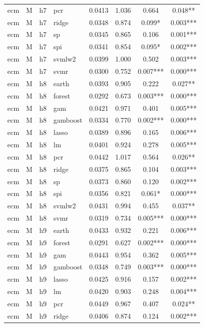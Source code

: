 \begin{ThreePartTable}
\begin{longtable}[t]{llclcccc}
ecm & M & h7 & pcr & 0.0413 & 1.036 & 0.664 & 0.048**\\
ecm & M & h7 & ridge & 0.0348 & 0.874 & 0.099* & 0.003***\\
ecm & M & h7 & sp & 0.0345 & 0.865 & 0.106 & 0.001***\\
ecm & M & h7 & spi & 0.0341 & 0.854 & 0.095* & 0.002***\\
ecm & M & h7 & svmlw2 & 0.0399 & 1.000 & 0.502 & 0.003***\\
ecm & M & h7 & svmr & 0.0300 & 0.752 & 0.007*** & 0.000***\\
\addlinespace
ecm & M & h8 & earth & 0.0393 & 0.905 & 0.222 & 0.027**\\
ecm & M & h8 & forest & 0.0292 & 0.673 & 0.003*** & 0.000***\\
ecm & M & h8 & gam & 0.0421 & 0.971 & 0.401 & 0.005***\\
ecm & M & h8 & gamboost & 0.0334 & 0.770 & 0.002*** & 0.000***\\
ecm & M & h8 & lasso & 0.0389 & 0.896 & 0.165 & 0.006***\\
ecm & M & h8 & lm & 0.0401 & 0.924 & 0.278 & 0.005***\\
ecm & M & h8 & pcr & 0.0442 & 1.017 & 0.564 & 0.026**\\
ecm & M & h8 & ridge & 0.0375 & 0.865 & 0.104 & 0.003***\\
ecm & M & h8 & sp & 0.0373 & 0.860 & 0.120 & 0.002***\\
ecm & M & h8 & spi & 0.0356 & 0.821 & 0.061* & 0.000***\\
ecm & M & h8 & svmlw2 & 0.0431 & 0.994 & 0.455 & 0.037**\\
ecm & M & h8 & svmr & 0.0319 & 0.734 & 0.005*** & 0.000***\\
\addlinespace
ecm & M & h9 & earth & 0.0433 & 0.932 & 0.221 & 0.006***\\
ecm & M & h9 & forest & 0.0291 & 0.627 & 0.002*** & 0.000***\\
ecm & M & h9 & gam & 0.0443 & 0.954 & 0.362 & 0.005***\\
ecm & M & h9 & gamboost & 0.0348 & 0.749 & 0.003*** & 0.000***\\
ecm & M & h9 & lasso & 0.0425 & 0.916 & 0.157 & 0.002***\\
ecm & M & h9 & lm & 0.0420 & 0.903 & 0.248 & 0.004***\\
ecm & M & h9 & pcr & 0.0449 & 0.967 & 0.407 & 0.024**\\
ecm & M & h9 & ridge & 0.0406 & 0.874 & 0.124 & 0.002***\\

\end{longtable}
\end{ThreePartTable}
